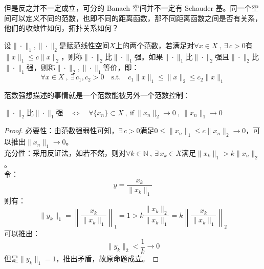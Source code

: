 但是反之并不一定成立，可分的 Banach 空间并不一定有 Schauder 基。同一个空间可以定义不同的范数，也即不同的距离函数，那不同距离函数之间是否有关系，他们的收敛性如何，拓扑关系如何？
\begin{definition}[等价范数]
设$\|\cdot\|_1,\|\cdot\|_2$是赋范线性空间$X$上的两个范数，若满足对$\forall x \in X \ , \ \exists \, c>0$有$\|x\|_1 \leq c\|x\|_2$，则称$\|\cdot\|_2$比$\|\cdot\|_1$强。如果$\|\cdot\|_1$比$\|\cdot\|_2$强且$\|\cdot\|_2$比$\|\cdot\|_1$强，则称$\|\cdot\|_2,\|\cdot\|_1$等价，即：
\[\forall x \in X \ , \ \exists \, c_1,c_2>0 \quad \text{s.t.} \quad c_1\|x\|_1 \leq \|x\|_2 \leq c_2\|x\|_1\]
\end{definition}
范数强想描述的事情就是一个范数能被另外一个范数控制：
\begin{theorem}
$\|\cdot\|_2$比$\|\cdot\|_1$强$ \quad \Leftrightarrow \quad \forall \{x_n\} \subset X \ , \ \text{if} \ \|x_n\|_2 \to 0 \ , \ \|x_n\|_1 \to 0$
\end{theorem}
\begin{proof}必要性：由范数强弱性可知，$\exists \, c>0$满足$0 \leq \|x_n\|_1 \leq c\|x_n\|_2 \to 0$，可以推出$\|x_n\|_1 \to 0$。\\
充分性：采用反证法，如若不然，则对$\forall k \in \mathbb{N} \ , \ \exists \, x_k \in X$满足$\|x_k\|_1>k\|x_n\|_2$。\\
令：
\[y=\frac{x_k}{\|x_k\|_1}\]
则有：
\[\|y_k\|_1=\left\|\frac{x_k}{\|x_k\|_1}\right\|_1=1>k\frac{\|x_k\|_2}{\|x_k\|_1}=k\left\|\frac{x_k}{\|x_k\|_1}\right\|_2\]
可以推出：
\[\|y_k\|_2<\frac{1}{k} \to 0\]
但是$\|y_k\|_1=1$，推出矛盾，故原命题成立。
\end{proof}

\newpage
